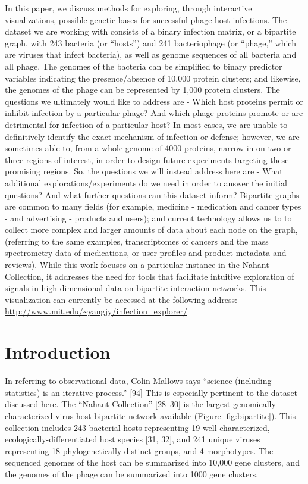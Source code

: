 \documentclass[12pt,twoside]{mitthesis-manusdown}
\begin{document}
In this paper, we discuss methods for exploring, through interactive
visualizations, possible genetic bases for successful phage host
infections. The dataset we are working with consists of a binary
infection matrix, or a bipartite graph, with 243 bacteria (or ``hosts'')
and 241 bacteriophage (or ``phage,'' which are viruses that infect
bacteria), as well as genome sequences of all bacteria and all phage.
The genomes of the bacteria can be simplified to binary predictor
variables indicating the presence/absence of 10,000 protein clusters;
and likewise, the genomes of the phage can be represented by 1,000
protein clusters. The questions we ultimately would like to address are
- Which host proteins permit or inhibit infection by a particular phage?
And which phage proteins promote or are detrimental for infection of a
particular host? In most cases, we are unable to definitively identify
the exact mechanism of infection or defense; however, we are sometimes
able to, from a whole genome of 4000 proteins, narrow in on two or three
regions of interest, in order to design future experiments targeting
these promising regions. So, the questions we will instead address here
are - What additional explorations/experiments do we need in order to
answer the initial questions? And what further questions can this
dataset inform? Bipartite graphs are common to many fields (for example,
medicine - medication and cancer types - and advertising - products and
users); and current technology allows us to to collect more complex and
larger amounts of data about each node on the graph, (referring to the
same examples, transcriptomes of cancers and the mass spectrometry data
of medications, or user profiles and product metadata and reviews).
While this work focuses on a particular instance in the Nahant
Collection, it addresses the need for tools that facilitate intuitive
exploration of signals in high dimensional data on bipartite interaction
networks. This visualization can currently be accessed at the following
address: \url{http://www.mit.edu/~yangjy/infection_explorer/}

\section{Introduction}\label{introduction-1}

In referring to observational data, Colin Mallows says ``science
(including statistics) is an iterative process.'' {[}94{]} This is
especially pertinent to the dataset discussed here. The ``Nahant
Collection'' {[}28--30{]} is the largest genomically-characterized
virus-host bipartite network available (Figure \ref{fig:bipartite}).
This collection includes 243 bacterial hosts representing 19
well-characterized, ecologically-differentiated host species {[}31,
32{]}, and 241 unique viruses representing 18 phylogenetically distinct
groups, and 4 morphotypes. The sequenced genomes of the host can be
summarized into 10,000 gene clusters, and the genomes of the phage can
be summarized into 1000 gene clusters.
\end{document}
